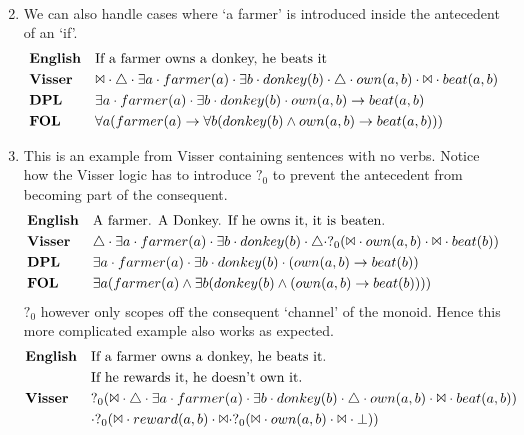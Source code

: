 \documentclass[12pt]{article}
\begin{document}
\begin{enumerate}
\begin{align*}
\end{align*}
\item
We can also handle cases where `a farmer' is introduced inside the antecedent of an `if'.
\begin{align*}
&\text{\textbf{English}}&&\text{If a farmer owns a donkey, he beats it} \\
&\text{\textbf{Visser}}&&\Bowtie \cdot \triangle \cdot \exists a \cdot farmer(a) \cdot \exists b \cdot donkey(b) \cdot \triangle \cdot own(a,b) \cdot \Bowtie \cdot beat(a,b) \\
&\text{\textbf{DPL}}&&\exists a \cdot farmer(a) \cdot \exists b \cdot donkey(b) \cdot own(a,b) \rightarrow beat(a,b) \\
&\text{\textbf{FOL}}&&\forall a(farmer(a) \rightarrow \forall b(donkey(b) \wedge own(a,b) \rightarrow beat(a,b))) \\
\end{align*}
\item
This is an example from Visser \cite{visser1999donkey} containing sentences with no verbs. Notice how the Visser logic has to introduce $?_0$ to prevent the antecedent from becoming part of the consequent.
\begin{align*}
&\text{\textbf{English}}&&\text{A farmer. A Donkey. If he owns it, it is beaten.} \\
&\text{\textbf{Visser}}&&\triangle \cdot \exists a \cdot farmer(a) \cdot \exists b \cdot donkey(b) \cdot \triangle \cdot ?_0(\Bowtie \cdot own(a,b) \cdot \Bowtie \cdot beat(b)) \\
&\text{\textbf{DPL}}&&\exists a \cdot farmer(a) \cdot \exists b \cdot donkey(b) \cdot (own(a,b) \rightarrow beat(b)) \\
&\text{\textbf{FOL}}&&\exists a(farmer(a) \wedge \exists b(donkey(b) \wedge (own(a,b) \rightarrow beat(b)))) \\
\end{align*}
$?_0$ however only scopes off the consequent `channel' of the monoid. Hence this more complicated example also works as expected.
\begin{align*}
&\text{\textbf{English}}&&\text{If a farmer owns a donkey, he beats it.}\\
&&&\text{If he rewards it, he doesn't own it.} \\
&\text{\textbf{Visser}}&&?_0(\Bowtie \cdot \triangle \cdot \exists a \cdot farmer(a) \cdot \exists b \cdot donkey(b) \cdot \triangle \cdot own(a,b) \cdot \Bowtie \cdot beat(a,b))\\&&& \cdot ?_0(\Bowtie \cdot reward(a,b) \cdot \Bowtie \cdot ?_0(\Bowtie \cdot own(a,b) \cdot \Bowtie \cdot \bot)) \\

\end{align*}
\end{enumerate}
\end{document}
